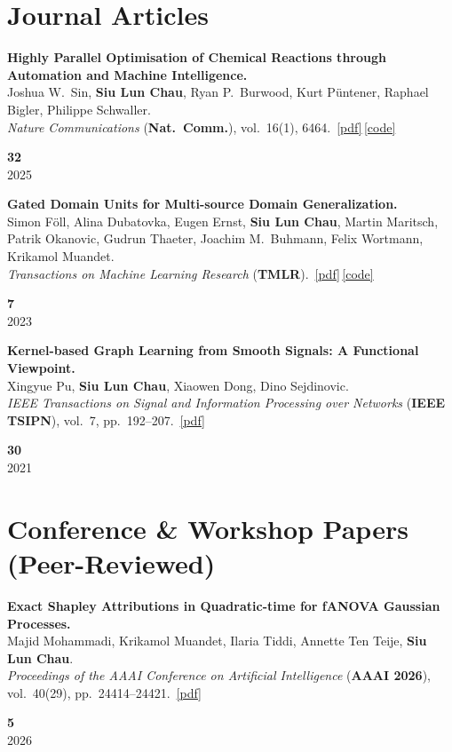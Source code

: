 \documentclass[11pt,a4paper]{article}
\newcommand{\me}{\textbf{Siu Lun Chau}}
\newcommand{\acro}[1]{\textcolor{accent}{\textbf{#1}}}
\newcommand{\venue}[2]{\textit{#1} (\acro{#2})}
\newcommand{\pdfb}[1]{\,\href{#1}{\textcolor{accent}{\small[pdf]}}}
\newcommand{\codeb}[1]{\,\href{#1}{\textcolor{accent}{\small[code]}}}
\newlength{\citecolwidth}\setlength{\citecolwidth}{2.4cm}
\newlength{\indexcolwidth}\setlength{\indexcolwidth}{3.2em}
\newcommand{\citebox}[2]{%
  {\color{citecol}\textbf{\large #1}}\\[1pt]
  {\color{mutedgrey}\small #2}%
}
\newcommand{\pubentry}[4]{%
  \noindent
  \makebox[\indexcolwidth][l]{\textbf{[#1]}}%
  \begin{minipage}[t]{\dimexpr\linewidth-\indexcolwidth-\citecolwidth-0.4em\relax}#2\end{minipage}%
  \hspace{0.4em}%
  \begin{minipage}[t]{\citecolwidth}\raggedleft\citebox{#3}{#4}\end{minipage}%
  \par\vspace{6pt}}
\begin{document}
\section{Journal Articles}

\pubentry{J1}{%
\textbf{Highly Parallel Optimisation of Chemical Reactions through Automation and Machine Intelligence.}\\
Joshua W.\ Sin, \me, Ryan P.\ Burwood, Kurt P\"untener, Raphael Bigler, Philippe Schwaller.\\
\venue{Nature Communications}{Nat.~Comm.}, vol.~16(1), 6464.%
\pdfb{https://chemrxiv.org/engage/chemrxiv/article-details/66f976b5cec5d6c142981e4e}\codeb{https://github.com/schwallergroup/minerva}%
}{32}{2025}

\pubentry{J2}{%
\textbf{Gated Domain Units for Multi-source Domain Generalization.}\\
Simon F\"oll, Alina Dubatovka, Eugen Ernst, \me, Martin Maritsch, Patrik Okanovic, Gudrun Thaeter, Joachim M.\ Buhmann, Felix Wortmann, Krikamol Muandet.\\
\venue{Transactions on Machine Learning Research}{TMLR}.%
\pdfb{https://arxiv.org/pdf/2206.12444.pdf}\codeb{https://github.com/im-ethz/pub-gdu4dg}%
}{7}{2023}

\pubentry{J3}{%
\textbf{Kernel-based Graph Learning from Smooth Signals: A Functional Viewpoint.}\\
Xingyue Pu, \me, Xiaowen Dong, Dino Sejdinovic.\\
\venue{IEEE Transactions on Signal and Information Processing over Networks}{IEEE TSIPN}, vol.~7, pp.~192--207.%
\pdfb{https://ieeexplore.ieee.org/stamp/stamp.jsp?arnumber=9356326}%
}{30}{2021}

\section{Conference \& Workshop Papers (Peer-Reviewed)}

\pubentry{C1}{%
\textbf{Exact Shapley Attributions in Quadratic-time for fANOVA Gaussian Processes.}\\
Majid Mohammadi, Krikamol Muandet, Ilaria Tiddi, Annette Ten Teije, \me.\\
\venue{Proceedings of the AAAI Conference on Artificial Intelligence}{AAAI 2026}, vol.~40(29), pp.~24414--24421.%
\pdfb{https://arxiv.org/pdf/2508.14499v1}%
}{5}{2026}
\end{document}

